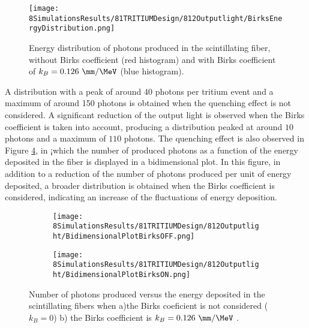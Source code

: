 \begin{figure}[h]
\centering
\texttt{[image: 8SimulationsResults/81TRITIUMDesign/812Outputlight/BirksEnergyDistribution.png]}
\caption{Energy distribution of photons produced in the scintillating fiber, without Birks coefficient (red histogram) and with Birks coefficient of $k_B=0.126~\mm/\MeV$ (blue histogram)\cite{SimulationPaperCarlos}.\label{fig:BirksEffectinEnergyDistribution}}
\end{figure}  

A distribution with a peak of around 40 photons per tritium event and a maximum of around 150 photons is obtained when the quenching effect is not considered. A significant reduction of the output light is observed when the Birks coefficient is taken into account, producing a distribution peaked at around $10$ photons and a maximum of $110$ photons. The quenching effect is also observed in Figure \ref{fig:2DimPlotBirks}, in ¡which the number of produced photons as a function of the energy deposited in the fiber is displayed in a bidimensional plot. In this figure, in addition to a reduction of the number of photons produced per unit of energy deposited, a broader distribution is obtained when the Birks coefficient is considered, indicating an increase of the fluctuations of energy deposition.

\begin{figure}
\centering
    \begin{subfigure}[b]{0.4\textwidth}
    \centering
    \texttt{[image: 8SimulationsResults/81TRITIUMDesign/812Outputlight/BidimensionalPlotBirksOFF.png]}  
    \caption{\label{subfig:2DimPlotNoBirks}}
    \end{subfigure}
    \hfill
    \begin{subfigure}[b]{0.4\textwidth}
    \centering
    \texttt{[image: 8SimulationsResults/81TRITIUMDesign/812Outputlight/BidimensionalPlotBirksON.png]}  
    \caption{\label{subfig:2DimPlotBirks}}
    \end{subfigure}
 \caption{Number of photons produced versus the energy deposited in the scintillating fibers when a)the Birks coeficient is not considered ($k_B=0$) b) the Birks coefficient is $k_B=0.126~\mm/\MeV$ \cite{SimulationPaperCarlos}.}
 \label{fig:2DimPlotBirks}
\end{figure}
